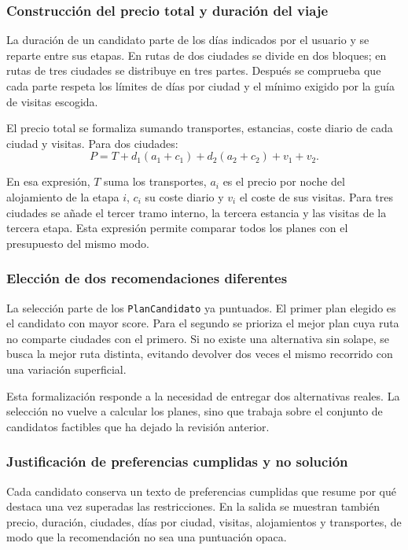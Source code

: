 \documentclass[11pt,a4paper]{article}
\begin{document}
\subsubsection{Construcci\'on del precio total y duraci\'on del viaje}
La duraci\'on de un candidato parte de los d\'ias indicados por el usuario y se
reparte entre sus etapas. En rutas de dos ciudades se divide en dos bloques; en
rutas de tres ciudades se distribuye en tres partes. Despu\'es se comprueba que
cada parte respeta los l\'imites de d\'ias por ciudad y el m\'inimo exigido por
la gu\'ia de visitas escogida.

El precio total se formaliza sumando transportes, estancias, coste diario de
cada ciudad y visitas. Para dos ciudades:
\[
    P = T + d_1(a_1 + c_1) + d_2(a_2 + c_2) + v_1 + v_2.
\]

En esa expresi\'on, \(T\) suma los transportes, \(a_i\) es el precio por noche
del alojamiento de la etapa \(i\), \(c_i\) su coste diario y \(v_i\) el coste
de sus visitas. Para tres ciudades se a\~nade el tercer tramo interno, la
tercera estancia y las visitas de la tercera etapa. Esta expresi\'on permite
comparar todos los planes con el presupuesto del mismo modo.

\subsubsection{Elecci\'on de dos recomendaciones diferentes}
La selecci\'on parte de los \texttt{PlanCandidato} ya puntuados. El primer plan
elegido es el candidato con mayor score. Para el segundo se prioriza el mejor
plan cuya ruta no comparte ciudades con el primero. Si no existe una
alternativa sin solape, se busca la mejor ruta distinta, evitando devolver dos
veces el mismo recorrido con una variaci\'on superficial.

Esta formalizaci\'on responde a la necesidad de entregar dos alternativas
reales. La selecci\'on no vuelve a calcular los planes, sino que trabaja sobre
el conjunto de candidatos factibles que ha dejado la revisi\'on anterior.

\subsubsection{Justificaci\'on de preferencias cumplidas y no soluci\'on}
Cada candidato conserva un texto de preferencias cumplidas que resume por qu\'e
destaca una vez superadas las restricciones. En la salida se muestran tambi\'en
precio, duraci\'on, ciudades, d\'ias por ciudad, visitas, alojamientos y
transportes, de modo que la recomendaci\'on no sea una puntuaci\'on opaca.
\end{document}
